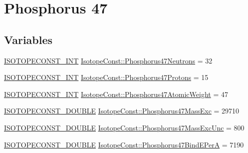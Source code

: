 \hypertarget{group___isotope_const-_phosphorus-_p47}{}\section{Phosphorus 47}
\label{group___isotope_const-_phosphorus-_p47}
\subsection*{Variables}
\begin{DoxyCompactItemize}
\item 
\mbox{\hyperlink{group___isotope_const-_macros_ga5f18360b3e99483a35c32d789e62621c}{I\+S\+O\+T\+O\+P\+E\+C\+O\+N\+S\+T\+\_\+\+I\+NT}} \mbox{\hyperlink{group___isotope_const-_phosphorus-_p47_gac75218fd26b8bc28079687add2f5a3a1}{Isotope\+Const\+::\+Phosphorus47\+Neutrons}} = 32
\item 
\mbox{\hyperlink{group___isotope_const-_macros_ga5f18360b3e99483a35c32d789e62621c}{I\+S\+O\+T\+O\+P\+E\+C\+O\+N\+S\+T\+\_\+\+I\+NT}} \mbox{\hyperlink{group___isotope_const-_phosphorus-_p47_ga89505fb76d85299783fc5fcc77eb1693}{Isotope\+Const\+::\+Phosphorus47\+Protons}} = 15
\item 
\mbox{\hyperlink{group___isotope_const-_macros_ga5f18360b3e99483a35c32d789e62621c}{I\+S\+O\+T\+O\+P\+E\+C\+O\+N\+S\+T\+\_\+\+I\+NT}} \mbox{\hyperlink{group___isotope_const-_phosphorus-_p47_ga4714a952ccbc9717037d01e8061c7f2b}{Isotope\+Const\+::\+Phosphorus47\+Atomic\+Weight}} = 47
\item 
\mbox{\hyperlink{group___isotope_const-_macros_ga8f45a7272ce02c0b4c65c44636ed719a}{I\+S\+O\+T\+O\+P\+E\+C\+O\+N\+S\+T\+\_\+\+D\+O\+U\+B\+LE}} \mbox{\hyperlink{group___isotope_const-_phosphorus-_p47_ga2cd7059198cb2e4bd7ecf69cd776bf5a}{Isotope\+Const\+::\+Phosphorus47\+Mass\+Exc}} = 29710
\item 
\mbox{\hyperlink{group___isotope_const-_macros_ga8f45a7272ce02c0b4c65c44636ed719a}{I\+S\+O\+T\+O\+P\+E\+C\+O\+N\+S\+T\+\_\+\+D\+O\+U\+B\+LE}} \mbox{\hyperlink{group___isotope_const-_phosphorus-_p47_ga1d7f8c64ec7e63727c404ef8b46cc027}{Isotope\+Const\+::\+Phosphorus47\+Mass\+Exc\+Unc}} = 800
\item 
\mbox{\hyperlink{group___isotope_const-_macros_ga8f45a7272ce02c0b4c65c44636ed719a}{I\+S\+O\+T\+O\+P\+E\+C\+O\+N\+S\+T\+\_\+\+D\+O\+U\+B\+LE}} \mbox{\hyperlink{group___isotope_const-_phosphorus-_p47_ga1f2de5a063b216094a929714350e7340}{Isotope\+Const\+::\+Phosphorus47\+Bind\+E\+PerA}} = 7190
\item 

\end{DoxyCompactItemize}
